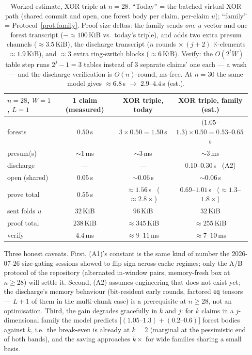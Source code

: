 \documentclass[11pt]{article}
\newcommand{\K}{\mathbb{K}}            %
\newcommand{\eq}{\mathsf{eq}}
\theoremstyle{plain}
\theoremstyle{definition}
\theoremstyle{remark}
\begin{document}
\begin{table}[ht]\centering\small
\begin{tabular}{@{}lccc@{}}
\toprule
$n=28$, $W=1$, $L=1$ & 1 claim (measured) & XOR triple, today & XOR triple, family (est.)\\
\midrule
forests               & $0.50$\,s          & $3\times0.50=1.50$\,s & $(1.05$--$1.3)\times0.50 = 0.53$--$0.65$\,s\\
presum(s)             & ${\sim}1$\,ms      & ${\sim}3$\,ms          & ${\sim}3$\,ms\\
discharge             & ---                & ---                    & $0.10$--$0.30$\,s \ (A2)\\
open (shared)         & $0.05$\,s          & ${\sim}0.06$\,s        & ${\sim}0.06$\,s\\
\midrule
prove total           & $0.55$\,s          & ${\approx}1.56$\,s \ (${\approx}2.8\times$) & $0.69$--$1.01$\,s \ (${\approx}1.3$--$1.8\times$)\\
\midrule
sent folds $u$        & $32$\,KiB          & $96$\,KiB              & $32$\,KiB\\
proof total           & $238$\,KiB         & ${\approx}345$\,KiB    & ${\approx}255$\,KiB\\
verify                & $4.4$\,ms          & ${\approx}9$--$11$\,ms & ${\approx}7$--$10$\,ms\\
\bottomrule
\end{tabular}
\caption{Worked estimate, XOR triple at $n=28$. ``Today'' = the batched
virtual-XOR path (shared commit and open, one forest body per claim,
per-claim $u$); ``family'' = Protocol~\ref{prot:family}. Proof-size deltas:
the family sends \emph{one} $u$ vector and one forest transcript
($-{\approx}100$\,KiB vs.\ today's triple), and adds two extra presum
channels (${\approx}3.5$\,KiB), the discharge transcript
($n$ rounds $\times\,(j{+}2)$ $\K$-elements ${\approx}1.9$\,KiB), and
${\approx}3$ extra ring-switch blocks (${\approx}6$\,KiB). Verify: the
$O(2^{t}W)$ table step runs $2^{j}{-}1=3$ tables instead of $3$ separate
claims' one each --- a wash --- and the discharge verification is
$O(n)$-round, ms-free. At $n=30$ the same model gives
${\approx}6.8$\,s $\to$ $2.9$--$4.4$\,s (est.).}\label{tab:cost}
\end{table}

Three honest caveats. First, (A1)'s constant is the same kind of number the
2026-07-26 size-gating sessions showed to flip sign across cache regimes;
only the A/B protocol of the repository (alternated in-window pairs,
memory-fresh box at $n\ge28$) will settle it. Second, (A2) assumes
engineering that does not exist yet; the discharge's memory behaviour
(bit-resident early rounds, factored $\eq$ tensors --- $L{+}1$ of them in the
multi-chunk case) is a prerequisite at $n\ge 28$, not an optimisation.
Third, the gain degrades gracefully in $k$ and $j$: for $k$ claims in a
$j$-dimensional family the model predicts
$\bigl[(1.05\text{--}1.3) + (0.2\text{--}0.6)\bigr]$ forest bodies against
$k$, i.e.\ the break-even is already at $k=2$ (marginal at the pessimistic
end of both bands), and the saving approaches $k\times$ for wide families
sharing a small basis.
\end{document}
